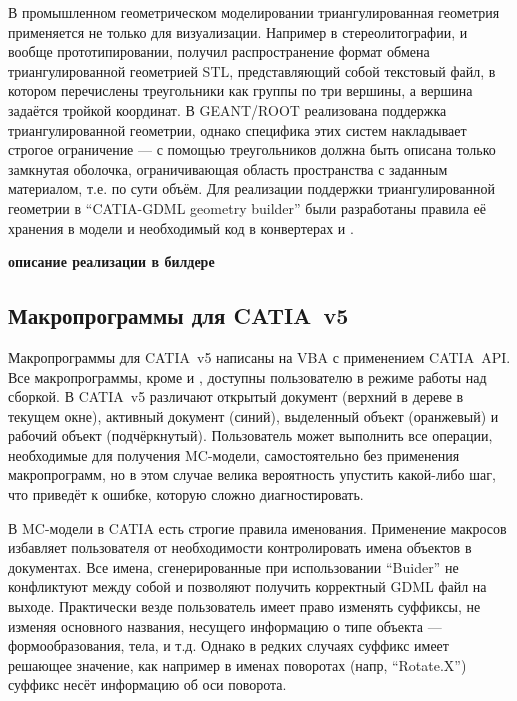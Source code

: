 В промышленном геометрическом моделировании триангулированная геометрия применяется не только для визуализации. Например в стереолитографии, и вообще прототипировании, получил распространение формат обмена триангулированной геометрией STL, представляющий собой текстовый файл, в котором перечислены треугольники как группы по три вершины, а вершина задаётся тройкой координат. В GEANT/ROOT реализована поддержка триангулированной геометрии, однако специфика этих систем накладывает строгое ограничение --- с помощью треугольников должна быть описана только замкнутая оболочка, ограничивающая область пространства с заданным материалом, т.е. по сути объём.
Для реализации поддержки триангулированной геометрии в ``CATIA-GDML geometry builder'' были разработаны правила её хранения в модели и необходимый код в конвертерах  и .

\todo \textbf{описание реализации в билдере}

\subsection{Макропрограммы для CATIA~v5}\label{sec:Macros}

Макропрограммы для CATIA~v5 написаны на VBA с применением CATIA~API. Все макропрограммы, кроме  и , доступны пользователю в режиме работы над сборкой. В CATIA~v5 различают открытый документ (верхний в дереве в текущем окне), активный документ (синий), выделенный объект (оранжевый) и рабочий объект (подчёркнутый). Пользователь может выполнить все операции, необходимые для получения MC-модели, самостоятельно без применения макропрограмм, но в этом случае велика вероятность упустить какой-либо шаг, что приведёт к ошибке, которую сложно диагностировать.

В MC-модели в CATIA есть строгие правила именования. Применение макросов избавляет пользователя от необходимости контролировать имена объектов в документах. Все имена, сгенерированные при использовании ``Buider'' не конфликтуют между собой и позволяют получить корректный GDML файл на выходе. Практически везде пользователь имеет право изменять суффиксы, не изменяя основного названия, несущего информацию о типе объекта --- формообразования, тела, и т.д. Однако в редких случаях суффикс имеет решающее значение, как например в именах поворотах (напр, ``Rotate.X'') суффикс несёт информацию об оси поворота.

